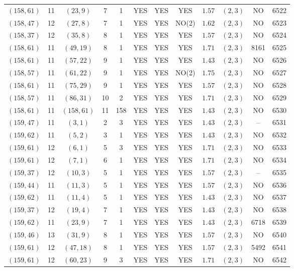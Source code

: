 \begin{longtable}{|c|c|c|c|c|c|c|c|c|c|c|c|}
$(158,61)$ & 11 & $(23,9)$ & 7 & 1 & YES & YES & YES & $1.57$ & $(2,3)$ & NO & 6522\\
$(158,47)$ & 12 & $(27,8)$ & 7 & 1 & YES & YES & NO(2) & $1.62$ & $(2,3)$ & NO & 6523\\
$(158,37)$ & 12 & $(35,8)$ & 8 & 1 & YES & YES & YES & $1.57$ & $(2,3)$ & NO & 6524\\
$(158,61)$ & 11 & $(49,19)$ & 8 & 1 & YES & YES & YES & $1.71$ & $(2,3)$ & 8161 & 6525\\
$(158,61)$ & 11 & $(57,22)$ & 9 & 1 & YES & YES & YES & $1.43$ & $(2,3)$ & NO & 6526\\
$(158,57)$ & 11 & $(61,22)$ & 9 & 1 & YES & YES & NO(2) & $1.75$ & $(2,3)$ & NO & 6527\\
$(158,61)$ & 11 & $(75,29)$ & 9 & 1 & YES & YES & YES & $1.57$ & $(2,3)$ & NO & 6528\\
$(158,57)$ & 11 & $(86,31)$ & 10 & 2 & YES & YES & YES & $1.71$ & $(2,3)$ & NO & 6529\\
$(158,61)$ & 11 & $(158,61)$ & 11 & 158 & YES & YES & YES & $1.43$ & $(2,3)$ & NO & 6530\\
$(159,47)$ & 11 & $(3,1)$ & 2 & 3 & YES & YES & YES & $1.43$ & $(2,3)$ & -- & 6531\\
$(159,62)$ & 11 & $(5,2)$ & 3 & 1 & YES & YES & YES & $1.43$ & $(2,3)$ & NO & 6532\\
$(159,61)$ & 12 & $(6,1)$ & 5 & 3 & YES & YES & YES & $1.71$ & $(2,3)$ & NO & 6533\\
$(159,61)$ & 12 & $(7,1)$ & 6 & 1 & YES & YES & YES & $1.71$ & $(2,3)$ & NO & 6534\\
$(159,37)$ & 12 & $(10,3)$ & 5 & 1 & YES & YES & YES & $1.57$ & $(2,3)$ & -- & 6535\\
$(159,44)$ & 11 & $(11,3)$ & 5 & 1 & YES & YES & YES & $1.57$ & $(2,3)$ & NO & 6536\\
$(159,62)$ & 11 & $(11,4)$ & 5 & 1 & YES & YES & YES & $1.43$ & $(2,3)$ & NO & 6537\\
$(159,37)$ & 12 & $(19,4)$ & 7 & 1 & YES & YES & YES & $1.43$ & $(2,3)$ & NO & 6538\\
$(159,62)$ & 11 & $(23,9)$ & 7 & 1 & YES & YES & YES & $1.43$ & $(2,3)$ & 6718 & 6539\\
$(159,46)$ & 13 & $(31,9)$ & 8 & 1 & YES & YES & YES & $1.57$ & $(2,3)$ & NO & 6540\\
$(159,61)$ & 12 & $(47,18)$ & 8 & 1 & YES & YES & YES & $1.57$ & $(2,3)$ & 5492 & 6541\\
$(159,61)$ & 12 & $(60,23)$ & 9 & 3 & YES & YES & YES & $1.71$ & $(2,3)$ & NO & 6542\\

\end{longtable}
